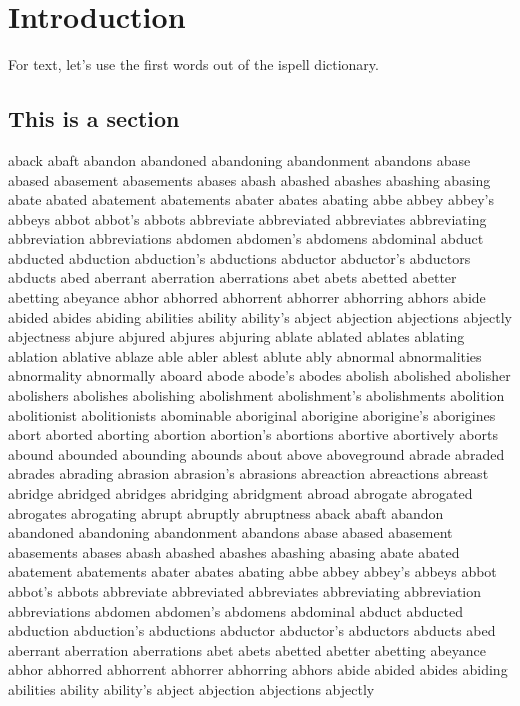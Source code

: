 \chapter{Introduction}

For text, let's use the first words out of the ispell dictionary.

\section{This is a section}
aback
abaft
abandon
abandoned
abandoning
abandonment
abandons
abase
abased
abasement
abasements
abases
abash
abashed
abashes
abashing
abasing
abate
abated
abatement
abatements
abater
abates
abating
abbe
abbey
abbey's
abbeys
abbot
abbot's
abbots
abbreviate
abbreviated
abbreviates
abbreviating
abbreviation
abbreviations
abdomen
abdomen's
abdomens
abdominal
abduct
abducted
abduction
abduction's
abductions
abductor
abductor's
abductors
abducts
abed
aberrant
aberration
aberrations
abet
abets
abetted
abetter
abetting
abeyance
abhor
abhorred
abhorrent
abhorrer
abhorring
abhors
abide
abided
abides
abiding
abilities
ability
ability's
abject
abjection
abjections
abjectly
abjectness
abjure
abjured
abjures
abjuring
ablate
ablated
ablates
ablating
ablation
ablative
ablaze
able
abler
ablest
ablute
ably
abnormal
abnormalities
abnormality
abnormally
aboard
abode
abode's
abodes
abolish
abolished
abolisher
abolishers
abolishes
abolishing
abolishment
abolishment's
abolishments
abolition
abolitionist
abolitionists
abominable
aboriginal
aborigine
aborigine's
aborigines
abort
aborted
aborting
abortion
abortion's 
abortions
abortive
abortively
aborts
abound
abounded
abounding
abounds
about
above
aboveground
abrade
abraded
abrades
abrading
abrasion
abrasion's
abrasions
abreaction
abreactions
abreast
abridge
abridged
abridges
abridging
abridgment
abroad
abrogate
abrogated
abrogates
abrogating
abrupt
abruptly
abruptness
aback
abaft
abandon
abandoned
abandoning
abandonment
abandons
abase
abased
abasement
abasements
abases
abash
abashed
abashes
abashing
abasing
abate
abated
abatement
abatements
abater
abates
abating
abbe
abbey
abbey's
abbeys
abbot
abbot's
abbots
abbreviate
abbreviated
abbreviates
abbreviating
abbreviation
abbreviations
abdomen
abdomen's
abdomens
abdominal
abduct
abducted
abduction
abduction's
abductions
abductor
abductor's
abductors
abducts
abed
aberrant
aberration
aberrations
abet
abets
abetted
abetter
abetting
abeyance
abhor
abhorred
abhorrent
abhorrer
abhorring
abhors
abide
abided
abides
abiding
abilities
ability
ability's
abject
abjection
abjections
abjectly
